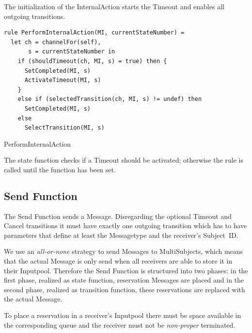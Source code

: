 The initialization of the InternalAction starts the Timeout and enables all
outgoing transitions.


\begin{listing}[htbp]
\begin{verbatim}
rule PerformInternalAction(MI, currentStateNumber) =
  let ch = channelFor(self),
       s = currentStateNumber in
    if (shouldTimeout(ch, MI, s) = true) then {
      SetCompleted(MI, s)
      ActivateTimeout(MI, s)
    }
    else if (selectedTransition(ch, MI, s) != undef) then
      SetCompleted(MI, s)
    else
      SelectTransition(MI, s)
\end{verbatim}
\caption{PerformInternalAction}
\label{lst:shortasm:PerformInternalAction}
\end{listing}


The state function checks if a Timeout should be activated; otherwise the
 rule is called until the  function has
been set.




\subsection{Send Function}


The Send Function sends a Message. Disregarding the optional Timeout and Cancel
transitions it must have exactly one outgoing transition which has to have parameters that
define at least the Messagetype and the receiver's Subject~ID.

We use an \textit{all-or-none} strategy to send Messages to MultiSubjects,
which means that the actual Message is only send when all receivers are able
to store it in their Inputpool. Therefore the Send Function is structured into
two phases: in the first phase, realized as state function, reservation Messages
are placed and in the second phase, realized as transition function, these reservations
are replaced with the actual Message.

To place a reservation in a receiver's Inputpool there must be space available
in the corresponding queue and the receiver must not be
\textit{non-proper} terminated.


